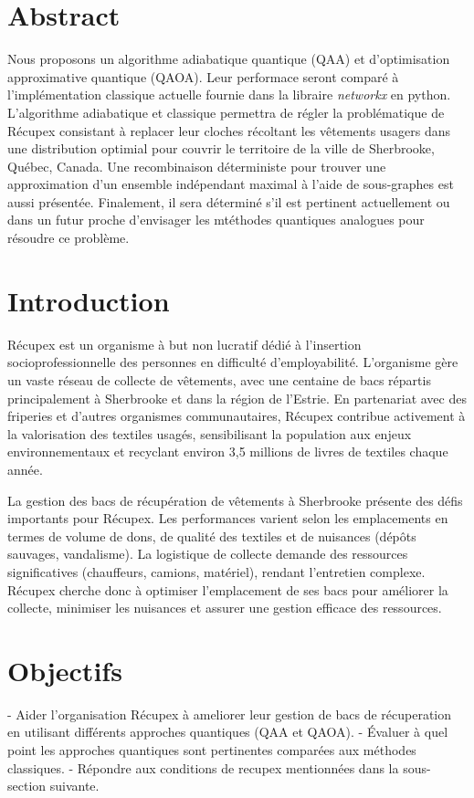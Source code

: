 \documentclass[11pt]{article}
\begin{document}

\tableofcontents
\newpage
\section*{Abstract}
Nous proposons un algorithme adiabatique quantique (QAA) et d'optimisation approximative quantique (QAOA). Leur performace seront comparé à l'implémentation classique actuelle fournie dans la libraire \textit{networkx} en python. L'algorithme adiabatique et classique permettra de régler la problématique de Récupex consistant à replacer leur cloches récoltant les vêtements usagers dans une distribution optimial pour couvrir le territoire de la ville de Sherbrooke, Québec, Canada. Une recombinaison déterministe pour trouver une approximation d'un ensemble indépendant maximal à l'aide de sous-graphes est aussi présentée. Finalement, il sera déterminé s'il est pertinent actuellement ou dans un futur proche d'envisager les mtéthodes quantiques analogues pour résoudre ce problème.

\section{Introduction}
Récupex est un organisme à but non lucratif dédié à l’insertion socioprofessionnelle des personnes en difficulté d’employabilité. L’organisme gère un vaste réseau de collecte de vêtements, avec une centaine de bacs répartis principalement à Sherbrooke et dans la région de l’Estrie. En partenariat avec des friperies et d’autres organismes communautaires, Récupex contribue activement à la valorisation des textiles usagés, sensibilisant la population aux enjeux environnementaux et recyclant environ 3,5 millions de livres de textiles chaque année.

La gestion des bacs de récupération de vêtements à Sherbrooke présente des défis importants pour Récupex. Les performances varient selon les emplacements en termes de volume de dons, de qualité des textiles et de nuisances (dépôts sauvages, vandalisme). La logistique de collecte demande des ressources significatives (chauffeurs, camions, matériel), rendant l'entretien complexe. Récupex cherche donc à optimiser l'emplacement de ses bacs pour améliorer la collecte, minimiser les nuisances et assurer une gestion efficace des ressources.

\section{Objectifs}
- Aider l'organisation Récupex à ameliorer leur gestion de bacs de récuperation en utilisant différents approches quantiques (QAA et QAOA).
- Évaluer à quel point les approches quantiques sont pertinentes comparées aux méthodes classiques.
- Répondre aux conditions de recupex mentionnées dans la sous-section suivante.
\end{document}
